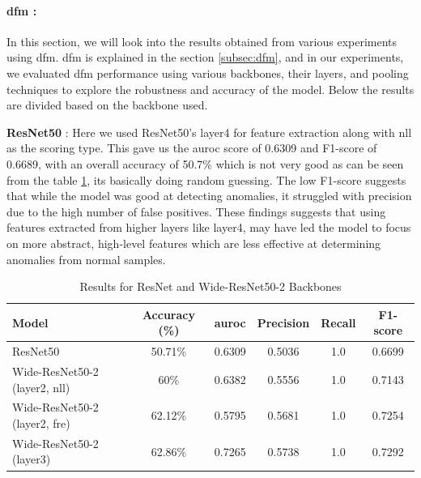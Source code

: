 
\paragraph*{\gls{dfm} : }

In this section, we will look into the results obtained from various experiments using \gls{dfm}. \gls{dfm} is explained in the section \ref{subsec:dfm}, and in our experiments, we evaluated \gls{dfm} performance using various backbones, their layers, and pooling techniques to explore the robustness and accuracy of the model. Below the results are divided based on the backbone used. 

\textbf{ResNet50} : Here we used ResNet50's layer4 for feature extraction along with \gls{nll} as the scoring type. This gave us the \gls{auroc} score of 0.6309 and F1-score of 0.6689, with an overall accuracy of 50.7\% which is not very good as can be seen from the table \ref{tab:dfm resnet results}, its basically doing random guessing. The low F1-score suggests that while the model was good at detecting anomalies, it struggled with precision due to the high number of false positives. These findings suggests that using features extracted from higher layers like layer4, may have led the model to focus on more abstract, high-level features which are less effective at determining anomalies from normal samples.

\begin{table}[ht!]
    \centering
    \begin{tabular}{|l|c|c|c|c|c|}
        \hline
        \textbf{Model} & \textbf{Accuracy (\%)} & \textbf{\gls{auroc}} &\textbf{Precision} & \textbf{Recall} & \textbf{F1-score} \\ \hline
        ResNet50 & 50.71\% & 0.6309 & 0.5036 & 1.0 & 0.6699 \\ \hline
        Wide-ResNet50-2 (layer2, nll) & 60\% & 0.6382 & 0.5556 & 1.0 & 0.7143 \\ \hline
        Wide-ResNet50-2 (layer2, fre) & 62.12\% & 0.5795 & 0.5681 & 1.0 & 0.7254 \\ \hline
        Wide-ResNet50-2 (layer3) & 62.86\% & 0.7265 & 0.5738 & 1.0 & 0.7292 \\ \hline
    \end{tabular}
    \caption{Results for ResNet and Wide-ResNet50-2 Backbones}
    \label{tab:dfm resnet results}
\end{table}

